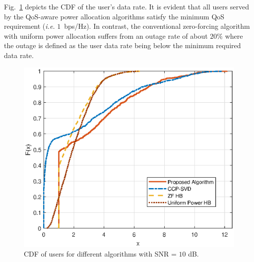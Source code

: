 \documentclass[10pt,journal,twocolumn,twoside]{IEEEtran}
\begin{document}
Fig.~\ref{fig:cdf} depicts the CDF of the user's data rate. It is evident that all users served by the QoS-aware power allocation algorithms satisfy the minimum QoS requirement (\textit{i.e.} $1$~bps/Hz). In contrast, the conventional zero-forcing algorithm with uniform power allocation suffers from an outage rate of about $20\%$ where the outage is defined as the user data rate being below the minimum required data rate.
\begin{figure}[ht]
	\begin{center}
		\includegraphics[scale=0.62]{Figure/cdf12users.eps}
		\caption{CDF of users for different algorithms with SNR = $10$ dB.}\label{fig:cdf}
	\end{center}
\end{figure}

%
%
%
\end{document}
